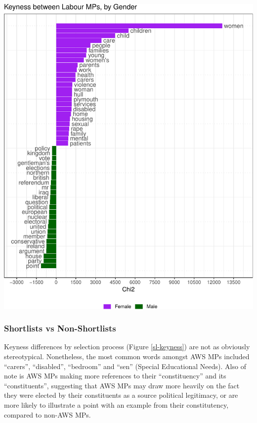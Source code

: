 \documentclass[]{article}
\let\origfigure\figure
\let\endorigfigure\endfigure
\renewenvironment{figure}[1][2] {
    \expandafter\origfigure\expandafter[H]
} {
    \endorigfigure
}
\begin{document}
\begin{figure}
\centering
\includegraphics{methodology_files/figure-latex/gender-keyness-plot-1.pdf}
\caption{\label{gender-keyness}Keyness between Labour MPs, by Gender}
\end{figure}

\hypertarget{shortlists-vs-non-shortlists-1}{%
\subsubsection{Shortlists vs
Non-Shortlists}\label{shortlists-vs-non-shortlists-1}}

Keyness differences by selection process (Figure \ref{sl-keyness}) are
not as obviously stereotypical. Nonetheless, the most common words
amongst AWS MPs included ``carers'', ``disabled'', ``bedroom'' and
``sen'' (Special Educational Needs). Also of note is AWS MPs making more
references to their ``constituency'' and its ``constituents'',
suggesting that AWS MPs may draw more heavily on the fact they were
elected by their constituents as a source political legitimacy, or are
more likely to illustrate a point with an example from their
constitutency, compared to non-AWS MPs.
\end{document}
